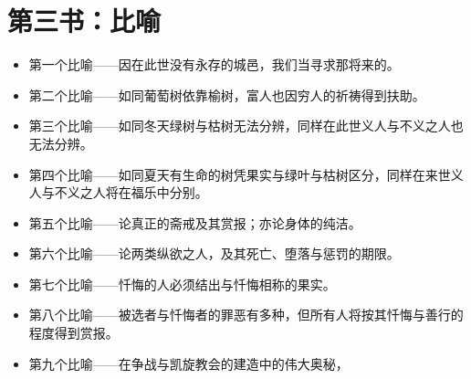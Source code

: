 
\section{第三书：比喻}

\begin{itemize}
\item 第一个比喻——因在此世没有永存的城邑，我们当寻求那将来的。
\end{itemize}

\begin{itemize}
\item 第二个比喻——如同葡萄树依靠榆树，富人也因穷人的祈祷得到扶助。
\end{itemize}

\begin{itemize}
\item 第三个比喻——如同冬天绿树与枯树无法分辨，同样在此世义人与不义之人也无法分辨。
\end{itemize}

\begin{itemize}
\item 第四个比喻——如同夏天有生命的树凭果实与绿叶与枯树区分，同样在来世义人与不义之人将在福乐中分别。
\end{itemize}

\begin{itemize}
\item 第五个比喻——论真正的斋戒及其赏报；亦论身体的纯洁。
\end{itemize}

\begin{itemize}
\item 第六个比喻——论两类纵欲之人，及其死亡、堕落与惩罚的期限。
\end{itemize}

\begin{itemize}
\item 第七个比喻——忏悔的人必须结出与忏悔相称的果实。
\end{itemize}

\begin{itemize}
\item 第八个比喻——被选者与忏悔者的罪恶有多种，但所有人将按其忏悔与善行的程度得到赏报。
\end{itemize}

\begin{itemize}
\item 第九个比喻——在争战与凯旋教会的建造中的伟大奥秘，
\end{itemize}

